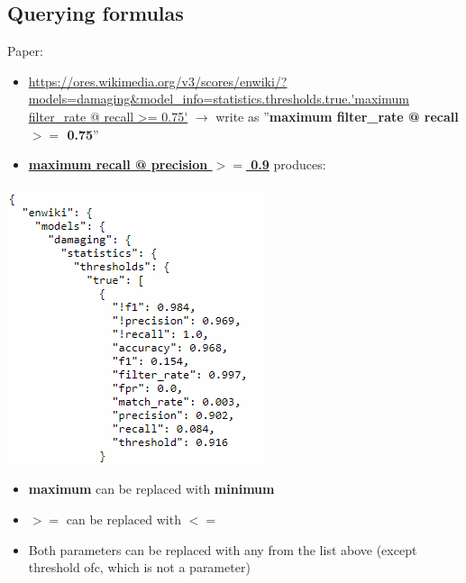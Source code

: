 \documentclass[12pt,a4paper]{article}
\begin{document}
\subsection{Querying formulas}
Paper:
\begin{itemize}
\item \url{https://ores.wikimedia.org/v3/scores/enwiki/?models=damaging&model_info=statistics.thresholds.true.'maximum filter_rate @ recall >= 0.75'} $\rightarrow$ write as ''\textbf{maximum filter\_rate @ recall $>=$ 0.75}''
\item \href{https://ores.wikimedia.org/v3/scores/enwiki/?models=damaging&model_info=statistics.thresholds.true.%27maximum%20recall%20@%20precision%20%3E=%200.9%27}{\textbf{maximum recall @ precision $>=$ 0.9}} produces:
\end{itemize}
\begin{description}
\item \includegraphics[scale=0.7]{resources/2/ORESmaxFilterAtRecall}
\end{description}
\begin{itemize}
\item \textbf{maximum} can be replaced with \textbf{minimum}
\item $>=$ can be replaced with $<=$
\item Both parameters can be replaced with any from the list above (except threshold ofc, which is not a parameter)
\end{itemize}
\newpage
\end{document}
